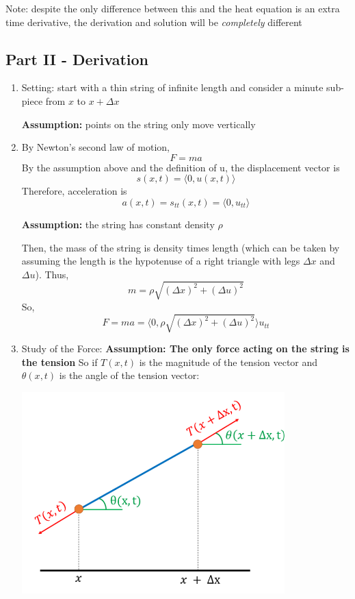 \documentclass[12pt]{article}
\newcommand{\brak}[1]{\langle #1 \rangle}
\begin{document}
Note: despite the only difference between this and the heat equation is an extra time derivative, the derivation and solution will be \emph{completely} different

\subsection*{Part II - Derivation}
\begin{enumerate}
    \item Setting: start with a thin string of infinite length and consider a minute sub-piece from $x$ to $x + \Delta x$
    
    \textbf{Assumption:} points on the string only move vertically

    \item By Newton's second law of motion,
    \[F = ma\] 
    By the assumption above and the definition of u, the displacement vector is 
    \[s(x, t) = \brak{0, u(x, t)}\]
    Therefore, acceleration is 
    \[a(x, t) = s_{tt}(x, t) = \brak{0, u_{tt}}\]

    \textbf{Assumption:} the string has constant density $\rho$ 
    
    Then, the mass of the string is density times length (which can be taken by assuming the length is the hypotenuse of a right triangle with legs $\Delta x$ and $\Delta u$). Thus, 
    \[m = \rho \sqrt{(\Delta x)^2 + (\Delta u)^2}\]
    So,
    \[F = ma = \brak{0, \rho \sqrt{(\Delta x)^2 + (\Delta u)^2}}u_{tt}\]

    \item Study of the Force: 
    \textbf{Assumption: The only force acting on the string is the tension}
    So if $T(x, t)$ is the magnitude of the tension vector and $\theta(x, t)$ is the angle of the tension vector:

    \includegraphics[width=0.8\textwidth]{Images/force.png}


\end{enumerate}
\end{document}
